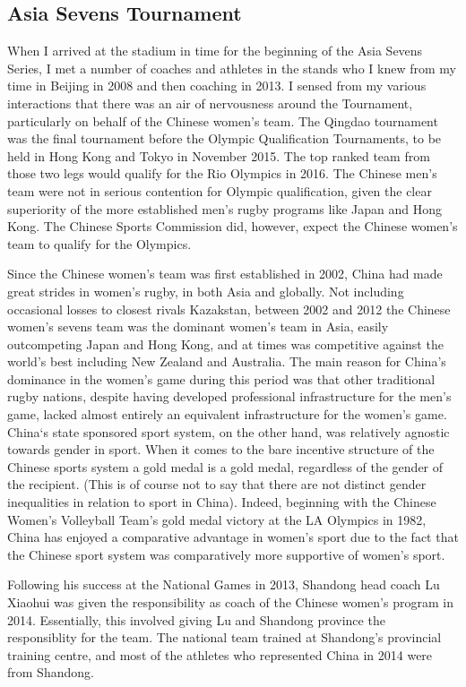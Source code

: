 \subsection{Asia Sevens Tournament}
When I arrived at the stadium in time for the beginning of the Asia Sevens Series, I met a number of coaches and athletes in the stands who I knew from my time in Beijing in 2008 and then coaching in 2013. I sensed from my various interactions that there was an air of nervousness around the Tournament, particularly on behalf of the Chinese women's team.   The Qingdao tournament was the final tournament before the Olympic Qualification Tournaments, to be held in Hong Kong and Tokyo in November 2015.  The top ranked team from those two legs would qualify for the Rio Olympics in 2016.  The Chinese men's team were not in serious contention for Olympic qualification, given the clear superiority of the more established men's rugby programs like Japan and Hong Kong. The Chinese Sports Commission did, however, expect the Chinese women's team to qualify for the Olympics.

Since the Chinese women's team was first established in 2002, China had made great strides in women's rugby, in both Asia and globally.  Not including occasional losses to closest rivals Kazakstan, between 2002 and 2012 the Chinese women's sevens team was the dominant women's team in Asia, easily outcompeting Japan and Hong Kong, and at times was competitive against the world's best including New Zealand and Australia.  The main reason for China's dominance in the women's game during this period was that other traditional rugby nations, despite having developed professional infrastructure for the men's game, lacked almost entirely an equivalent infrastructure for the women's game. China`s state sponsored sport system, on the other hand, was relatively agnostic towards gender in sport. When it comes to the bare incentive structure of the Chinese sports system a gold medal is a gold medal, regardless of the gender of the recipient. (This is of course not to say that there are not distinct gender inequalities in relation to sport in China).  Indeed, beginning with the Chinese Women's Volleyball Team's gold medal victory at the LA Olympics in 1982, China has enjoyed a comparative advantage in women's sport due to the fact that the Chinese sport system was comparatively more supportive of women's sport.

Following his success at the National Games in 2013, Shandong head coach Lu Xiaohui was given the responsibility as coach of the Chinese women's program in 2014.  Essentially, this involved giving Lu and  Shandong province the responsiblity for the team.  The national team trained at Shandong's provincial training centre, and most of the athletes who represented China in 2014 were from Shandong.

